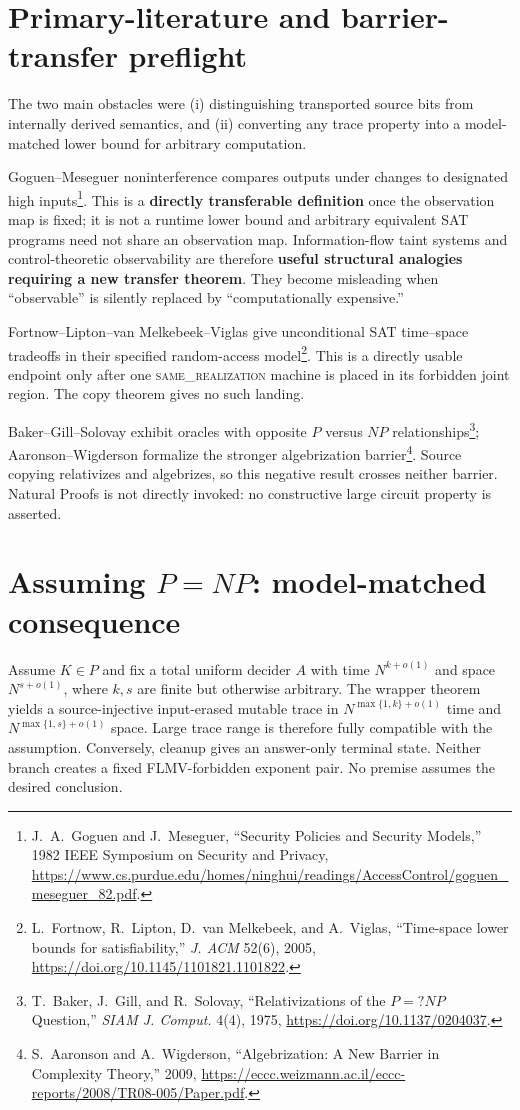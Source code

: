 \documentclass[11pt]{article}
\newcommand{\same}{\textsc{same\_realization}}
\begin{document}
\section{Primary-literature and barrier-transfer preflight}
The two main obstacles were (i) distinguishing transported source bits from
internally derived semantics, and (ii) converting any trace property into a
model-matched lower bound for arbitrary computation.

Goguen--Meseguer noninterference compares outputs under changes to designated
high inputs\footnote{J.~A.~Goguen and J.~Meseguer, ``Security Policies and
Security Models,'' 1982 IEEE Symposium on Security and Privacy,
\url{https://www.cs.purdue.edu/homes/ninghui/readings/AccessControl/goguen_meseguer_82.pdf}.}.
This is a \textbf{directly transferable definition} once the observation map
is fixed; it is not a runtime lower bound and arbitrary equivalent SAT
programs need not share an observation map.  Information-flow taint systems
and control-theoretic observability are therefore \textbf{useful structural
analogies requiring a new transfer theorem}.  They become misleading when
``observable'' is silently replaced by ``computationally expensive.''

Fortnow--Lipton--van Melkebeek--Viglas give unconditional SAT time--space
tradeoffs in their specified random-access model\footnote{L.~Fortnow,
R.~Lipton, D.~van Melkebeek, and A.~Viglas, ``Time-space lower bounds for
satisfiability,'' \emph{J. ACM} 52(6), 2005,
\url{https://doi.org/10.1145/1101821.1101822}.}.  This is a directly usable
endpoint only after one \same{} machine is placed in its forbidden joint
region.  The copy theorem gives no such landing.

Baker--Gill--Solovay exhibit oracles with opposite $P$ versus $NP$
relationships\footnote{T.~Baker, J.~Gill, and R.~Solovay,
``Relativizations of the $P=?NP$ Question,'' \emph{SIAM J. Comput.} 4(4),
1975, \url{https://doi.org/10.1137/0204037}.}; Aaronson--Wigderson formalize
the stronger algebrization barrier\footnote{S.~Aaronson and A.~Wigderson,
``Algebrization: A New Barrier in Complexity Theory,'' 2009,
\url{https://eccc.weizmann.ac.il/eccc-reports/2008/TR08-005/Paper.pdf}.}.
Source copying relativizes and algebrizes, so this negative result crosses
neither barrier.  Natural Proofs is not directly invoked: no constructive
large circuit property is asserted.

\section{Assuming \texorpdfstring{$P=NP$}{P=NP}: model-matched consequence}
Assume $K\in P$ and fix a total uniform decider $A$ with time $N^{k+o(1)}$
and space $N^{s+o(1)}$, where $k,s$ are finite but otherwise arbitrary.  The
wrapper theorem yields a source-injective input-erased mutable trace in
$N^{\max\{1,k\}+o(1)}$ time and $N^{\max\{1,s\}+o(1)}$ space.  Large trace
range is therefore fully compatible with the assumption.  Conversely,
cleanup gives an answer-only terminal state.  Neither branch creates a fixed
FLMV-forbidden exponent pair.  No premise assumes the desired conclusion.
\end{document}
